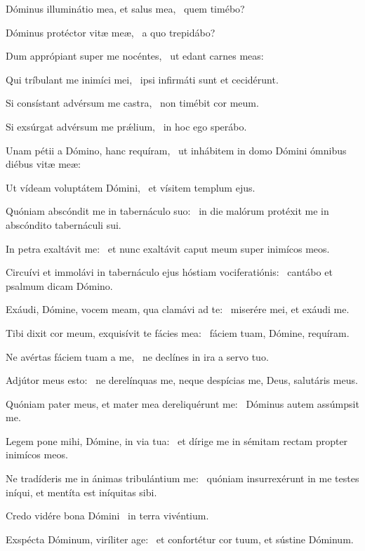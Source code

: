 \item Dóminus illuminátio mea, et salus mea,~\psstar{} quem timébo?

\item Dóminus protéctor vitæ meæ,~\psstar{} a quo trepidábo?

\item Dum apprópiant super me nocéntes,~\psstar{} ut edant carnes meas:

\item Qui tríbulant me inimíci mei,~\psstar{} ipsi infirmáti sunt et cecidérunt.

\item Si consístant advérsum me castra,~\psstar{} non timébit cor meum.

\item Si exsúrgat advérsum me prǽlium,~\psstar{} in hoc ego sperábo.

\item Unam pétii a Dómino, hanc requíram,~\psstar{} ut inhábitem in domo Dómini ómnibus diébus vitæ meæ:

\item Ut vídeam voluptátem Dómini,~\psstar{} et vísitem templum ejus.

\item Quóniam abscóndit me in tabernáculo suo:~\psstar{} in die malórum protéxit me in abscóndito tabernáculi sui.

\item In petra exaltávit me:~\psstar{} et nunc exaltávit caput meum super inimícos meos.

\item Circuívi et immolávi in tabernáculo ejus hóstiam vociferatiónis:~\psstar{} cantábo et psalmum dicam Dómino.

\item Exáudi, Dómine, vocem meam, qua clamávi ad te:~\psstar{} miserére mei, et exáudi me.

\item Tibi dixit cor meum, exquisívit te fácies mea:~\psstar{} fáciem tuam, Dómine, requíram.

\item Ne avértas fáciem tuam a me,~\psstar{} ne declínes in ira a servo tuo.

\item Adjútor meus esto:~\psstar{} ne derelínquas me, neque despícias me, Deus, salutáris meus.

\item Quóniam pater meus, et mater mea dereliquérunt me:~\psstar{} Dóminus autem assúmpsit me.

\item Legem pone mihi, Dómine, in via tua:~\psstar{} et dírige me in sémitam rectam propter inimícos meos.

\item Ne tradíderis me in ánimas tribulántium me:~\psstar{} quóniam insurrexérunt in me testes iníqui, et mentíta est iníquitas sibi.

\item Credo vidére bona Dómini~\psstar{} in terra vivéntium.

\item Exspécta Dóminum, viríliter age:~\psstar{} et confortétur cor tuum, et sústine Dóminum.


